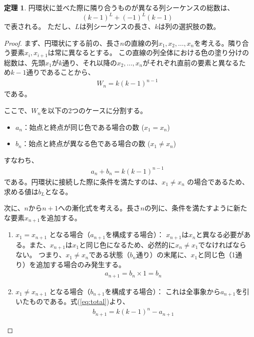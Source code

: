 \documentclass[a4paper,11pt,dvipdfmx]{jsarticle}
\theoremstyle{definition}
\newtheorem{theorem}[definition]{定理}
\begin{document}
\begin{theorem}
  円環状に並べた際に隣り合うものが異なる列シーケンスの総数は、 
  \[
    (k-1)^L + (-1)^L(k-1)
  \]
  で表される。
  ただし、$L$は列シーケンスの長さ、$k$は列の選択肢の数。
\end{theorem}
\begin{proof}
  まず、円環状にする前の、長さ$n$の直線の列$x_1, x_2, \dots, x_n$を考える。隣り合う要素$x_i, x_{i+1}$は常に異なるとする。
  この直線の列全体における色の塗り分けの総数は、先頭$x_1$が$k$通り、それ以降の$x_2, \dots, x_n$がそれぞれ直前の要素と異なるため$k-1$通りであることから、
  \begin{align}
    W_n = k(k-1)^{n-1}
  \end{align}
  である。

  ここで、$W_n$を以下の2つのケースに分割する。
  \begin{itemize}
    \item $a_n$：始点と終点が同じ色である場合の数 ($x_1 = x_n$)
    \item $b_n$：始点と終点が異なる色である場合の数 ($x_1 \neq x_n$)
  \end{itemize}
  すなわち、
  \begin{align}
    a_n + b_n = k(k-1)^{n-1} \label{eq:total}
  \end{align}
  である。円環状に接続した際に条件を満たすのは、$x_1 \neq x_n$ の場合であるため、求める値は$b_L$となる。

  次に、$n$から$n+1$への漸化式を考える。長さ$n$の列に、条件を満たすように新たな要素$x_{n+1}$を追加する。
  \begin{enumerate}
    \item $x_1 = x_{n+1}$ となる場合（$a_{n+1}$を構成する場合）：
    $x_{n+1}$は$x_n$と異なる必要がある。また、$x_{n+1}$は$x_1$と同じ色になるため、必然的に$x_n \neq x_1$でなければならない。
    つまり、$x_1 \neq x_n$である状態（$b_n$通り）の末尾に、$x_1$と同じ色（1通り）を追加する場合のみ発生する。
    \begin{align}
      a_{n+1} = b_n \times 1 = b_n \label{eq:rec_a}
    \end{align}
    
    \item $x_1 \neq x_{n+1}$ となる場合（$b_{n+1}$を構成する場合）：
    これは全事象から$a_{n+1}$を引いたものである。式(\ref{eq:total})より、
    \begin{align}
      b_{n+1} = k(k-1)^n - a_{n+1}
    \end{align}
  \end{enumerate}


\end{proof}
\end{document}
